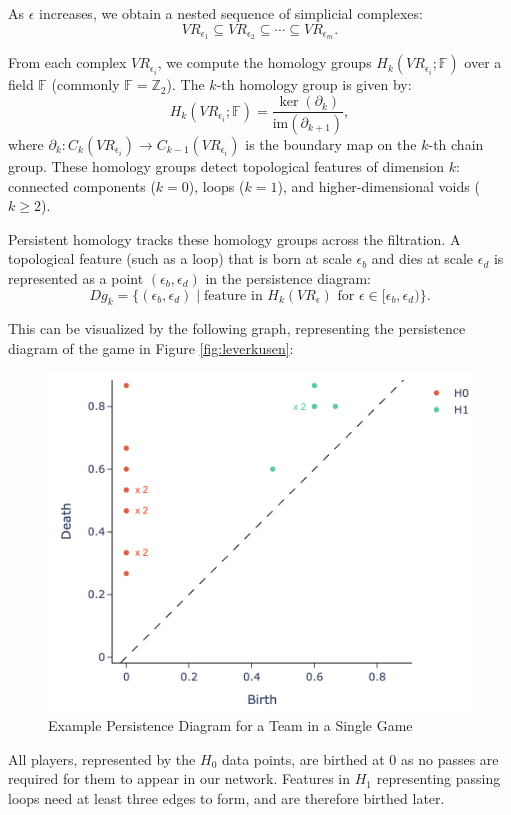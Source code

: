 \documentclass[10pt,twocolumn]{article}
\begin{document}
As $\epsilon$ increases, we obtain a nested sequence of simplicial complexes:
\[
VR_{\epsilon_1} \subseteq VR_{\epsilon_2} \subseteq \cdots \subseteq VR_{\epsilon_m}.
\]

From each complex $VR_{\epsilon_i}$, we compute the homology groups $H_k(VR_{\epsilon_i}; \mathbb{F})$ over a field $\mathbb{F}$ (commonly $\mathbb{F}=\mathbb{Z}_2$). The $k$-th homology group is given by:
\[
H_k(VR_{\epsilon_i}; \mathbb{F}) = \frac{\ker(\partial_k)}{\mathrm{im}(\partial_{k+1})},
\]
where $\partial_k : C_k(VR_{\epsilon_i}) \to C_{k-1}(VR_{\epsilon_i})$ is the boundary map on the $k$-th chain group. These homology groups detect topological features of dimension $k$: connected components ($k=0$), loops ($k=1$), and higher-dimensional voids ($k \geq 2$).

Persistent homology tracks these homology groups across the filtration. A topological feature (such as a loop) that is born at scale $\epsilon_b$ and dies at scale $\epsilon_d$ is represented as a point $(\epsilon_b, \epsilon_d)$ in the persistence diagram:
\[
Dg_k = \{(\epsilon_b, \epsilon_d) \mid \text{feature in } H_k(VR_{\epsilon}) \text{ for } \epsilon \in [\epsilon_b,\epsilon_d)\}.
\]

This can be visualized by the following graph, representing the persistence diagram of the game in Figure \ref{fig:leverkusen}:

\begin{figure}[H]
    \centering
    \includegraphics[width=0.8\linewidth]{images/birthdeath.png}
    \caption{Example Persistence Diagram for a Team in a Single Game}
    \label{fig:persistence_diagram}
\end{figure}

All players, represented by the $H_0$ data points, are birthed at 0 as no passes are required for them to appear in our network. Features in $H_1$ representing passing loops need at least three edges to form, and are therefore birthed later.
\end{document}
